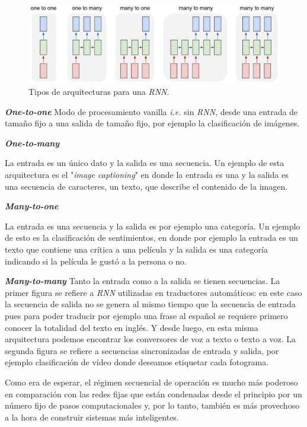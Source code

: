 \documentclass[a4paper,12pt]{article}
\begin{document}
\begin{figure}[H]
	\begin{center}				
	\includegraphics[width=1\textwidth]{rnnarch.jpg}
  	\caption{Tipos de arquitecturas para una \textit{RNN}.}
  	\label{fig:rnnarch}
  	\end{center}
\end{figure}

\textbf{\textit{One-to-one}}
Modo de procesamiento vanilla \textit{i.e.} sin \textit{RNN}, desde una entrada de tamaño fijo a una salida de tamaño fijo, por ejemplo la clasificación de imágenes.

\textbf{\textit{One-to-many}}

La entrada es un único dato y la salida es una secuencia. Un ejemplo de esta arquitectura es el "\textit{image captioning}" en donde la entrada es una y la salida es una secuencia de caracteres, un texto, que describe el contenido de la imagen. 

\textbf{\textit{Many-to-one}}

La entrada es una secuencia y la salida es por ejemplo una categoría. Un ejemplo de esto es la clasificación de sentimientos, en donde por ejemplo la entrada es un texto que contiene una crítica a una película y la salida es una categoría indicando si la película le gustó a la persona o no.

\textbf{\textit{Many-to-many}}
Tanto la entrada como a la salida se tienen secuencias. La primer figura se refiere a \textit{RNN} utilizadas en traductores automáticos: en este caso la secuencia de salida no se genera al mismo tiempo que la secuencia de entrada pues para poder traducir por ejemplo una frase al español se requiere primero conocer la totalidad del texto en inglés. Y desde luego, en esta misma arquitectura podemos encontrar los conversores de voz a texto o texto a voz.
La segunda figura se refiere a secuencias sincronizadas de entrada y salida, por ejemplo clasificación de vídeo donde deseamos etiquetar cada fotograma.

Como era de esperar, el régimen secuencial de operación es mucho más poderoso en comparación con las redes fijas que están condenadas desde el principio por un número fijo de pasos computacionales y, por lo tanto, también es más provechoso a la hora de construir sistemas más inteligentes. 
\end{document}
